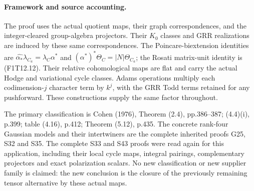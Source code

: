 \paragraph{Framework and source accounting.}
The proof uses the actual quotient maps, their graph
correspondences, and the integer-cleared group-algebra
projectors. Their \(K_0\) classes and GRR realizations
are induced by these same correspondences. The
Poincare-biextension identities are
\(\widehat{\alpha_*}\lambda_{C_a}=\lambda_C\alpha^*\)
and \((\alpha^*)^*\Theta_C=|N|\Theta_{C_a}\); the
Rosati matrix-unit identity is (F1T12.12).
Their relative cohomological maps are flat and carry the
actual Hodge and variational cycle classes. Adams
operations multiply each codimension-\(j\) character
term by \(k^j\), with the GRR Todd terms retained for
any pushforward. These constructions supply the same
factor throughout.

The primary classification is Cohen (1976), Theorem (2.4),
pp.386--387; (4.4)(i), p.399; table (4.16), p.412;
Theorem (5.12), p.435. The concrete rank-four Gaussian
models and their intertwiners are the complete inherited
proofs G25, S32 and S35. The complete S33 and S43 proofs
were read again for this application, including their
local cycle maps, integral pairings, complementary
projectors and exact polarization scalars. No new
classification or new supplier family is claimed:
the new conclusion is the closure of the previously
remaining tensor alternative by these actual maps.
